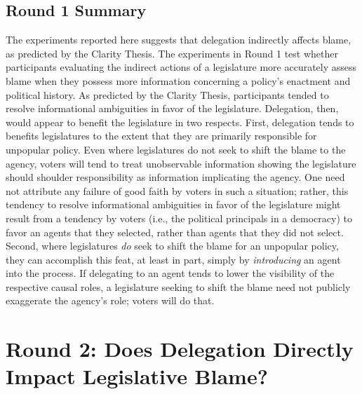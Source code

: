 \documentclass{article}
\begin{document}
\subsection{Round 1 Summary}

The experiments reported here suggests that delegation indirectly affects blame, as predicted by the Clarity Thesis. The experiments in Round 1 test whether participants evaluating the indirect actions of a legislature more accurately assess blame when they possess more information concerning a policy's enactment and political history. As predicted by the Clarity Thesis, participants tended to resolve informational ambiguities in favor of the legislature. Delegation, then, would appear to benefit the legislature in two respects. First, delegation tends to benefits legislatures to the extent that they are primarily responsible for unpopular policy. Even where legislatures do not seek to shift the blame to the agency, voters will tend to treat unobservable information showing the legislature should shoulder responsibility as information implicating the agency. One need not attribute any failure of good faith by voters in such a situation; rather, this tendency to resolve informational ambiguities in favor of the legislature might result from a tendency by voters (i.e., the political principals in a democracy) to favor an agents that they selected, rather than agents that they did not select. Second, where legislatures \emph{do} seek to shift the blame for an unpopular policy, they can accomplish this feat, at least in part, simply by \emph{introducing} an agent into the process. If delegating to an agent tends to lower the visibility of the respective causal roles, a legislature seeking to shift the blame need not publicly exaggerate the agency's role; voters will do that.  

\section{Round 2: Does Delegation Directly Impact Legislative Blame?}
\end{document}
